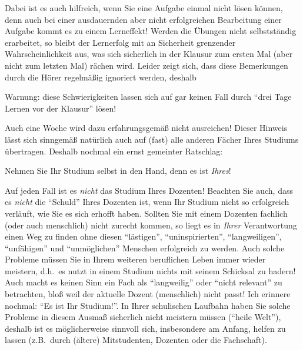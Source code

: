 Dabei ist es auch hilfreich, wenn Sie eine Aufgabe einmal nicht lösen können,
denn auch bei einer ausdauernden aber nicht erfolgreichen Bearbeitung
einer Aufgabe kommt es zu einem Lerneffekt! Werden die Übungen nicht
selbstständig erarbeitet, so bleibt der Lernerfolg mit an Sicherheit
grenzender Wahrscheinlichkeit aus, was sich sicherlich in der Klausur
zum ersten Mal (aber nicht zum letzten Mal) rächen wird. Leider zeigt
sich, dass diese Bemerkungen durch die Hörer regelmäßig ignoriert
werden, deshalb

\begin{center}
\large Warnung:  diese Schwierigkeiten lassen sich auf gar keinen Fall durch 
"`drei Tage Lernen vor der Klausur"' lösen!
\end{center}

Auch eine Woche wird dazu erfahrungsgemäß nicht ausreichen! Dieser
Hinweis lässt sich sinngemäß natürlich auch auf (fast) alle anderen
Fächer Ihres Studiums übertragen. Deshalb nochmal ein ernst gemeinter Ratschlag:
\begin{center}
	\large Nehmen Sie Ihr Studium selbst in den Hand, denn es ist \emph{Ihres}!
\end{center}
Auf jeden Fall ist es \emph{nicht} das Studium Ihres Dozenten! Beachten Sie auch, dass es 
\emph{nicht} die "`Schuld"' Ihres Dozenten ist, wenn Ihr Studium nicht so erfolgreich
verläuft, wie Sie es sich erhofft haben. Sollten Sie mit einem Dozenten fachlich (oder 
auch menschlich) nicht zurecht kommen, so liegt es in \emph{Ihrer} Verantwortung einen Weg
zu finden ohne diesen "`lästigen"', "`uninspirierten"', "`langweiligen"', "`unfähigen"' und 
"`unmöglichen"' Menschen erfolgreich zu werden. Auch solche 
Probleme müssen Sie in Ihrem weiteren beruflichen Leben immer wieder meistern, d.h.~es nutzt
in einem Studium nichts mit seinem Schicksal zu hadern! Auch macht es keinen Sinn ein 
Fach als "`langweilig"' oder "`nicht relevant"' zu betrachten, bloß weil der aktuelle 
Dozent (menschlich) nicht passt! Ich erinnere nochmal: "`Es ist Ihr Studium!"'.
In Ihrer schulischen Laufbahn haben Sie solche Probleme  in diesem Ausmaß sicherlich 
nicht meistern müssen ("`heile Welt"'),  deshalb ist es möglicherweise sinnvoll 
sich, insbesondere am Anfang, helfen zu lassen (z.B.~durch (ältere) Mitstudenten,  Dozenten 
oder die Fachschaft).

\goodbreak
\bigskip

